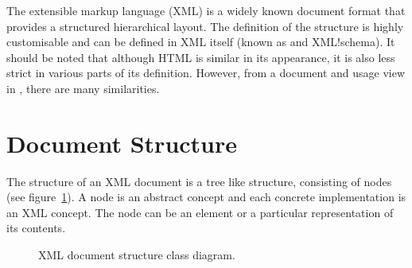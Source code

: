 \documentclass[10pt,a4paper,openany]{mudbook}
\newcommand{\indexrm}[2][]{\textrm{#2}\index{#2#1}}
\begin{document}
The extensible markup language (\indexrm{XML}) \cite{W3C:XML} is a widely
known document format that provides a structured hierarchical layout. The
definition of the structure is highly customisable and can be defined in XML
itself (known as and \indexrm{XML!schema}). It should be noted that although
\indexrm{HTML} is similar in its appearance, it is also less strict in various
parts of its definition. However, from a document and usage view in \MUDLib,
there are many similarities.

\section{Document Structure}

The structure of an XML document is a tree like structure, consisting of
nodes (see figure~\ref{fig:xml-doc-class}). A node is an abstract concept
and each concrete implementation is an XML concept. The node can be an
element or a particular representation of its contents. 

\begin{figure}[hbt]
  \centering
  \caption{XML document structure class diagram.}
  \label{fig:xml-doc-class}
\end{figure}
\end{document}
